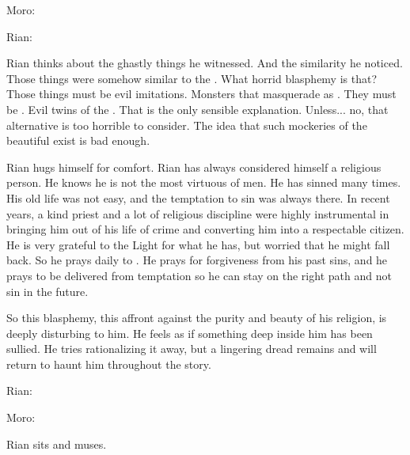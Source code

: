 Moro:

Rian:

Rian thinks about the ghastly things he witnessed. 
And the similarity he noticed. 
Those things were somehow similar to the \sephiroth.
What horrid blasphemy is that?
Those things must be evil imitations. 
Monsters that masquerade as \sephiroth.
They must be \qliphoth.
Evil twins of the \sephiroth.
That is the only sensible explanation.
Unless... no, that alternative is too horrible to consider. 
The idea that such mockeries of the beautiful \sephiroth exist is bad enough. 

Rian hugs himself for comfort. 
Rian has always considered himself a religious person. 
He knows he is not the most virtuous of men. 
He has sinned many times. 
His old life was not easy, and the temptation to sin was always there. 
In recent years, a kind priest and a lot of religious discipline were highly instrumental in bringing him out of his life of crime and converting him into a respectable citizen. 
He is very grateful to the Light for what he has, but worried that he might fall back. 
So he prays daily to \iquin.
He prays for forgiveness from his past sins, and he prays to be delivered from temptation so he can stay on the right path and not sin in the future. 

So this blasphemy, this affront against the purity and beauty of his religion, is deeply disturbing to him. 
He feels as if something deep inside him has been sullied. 
He tries rationalizing it away, but a lingering dread remains and will return to haunt him throughout the story. 

Rian:

Moro: 

Rian sits and muses. 











